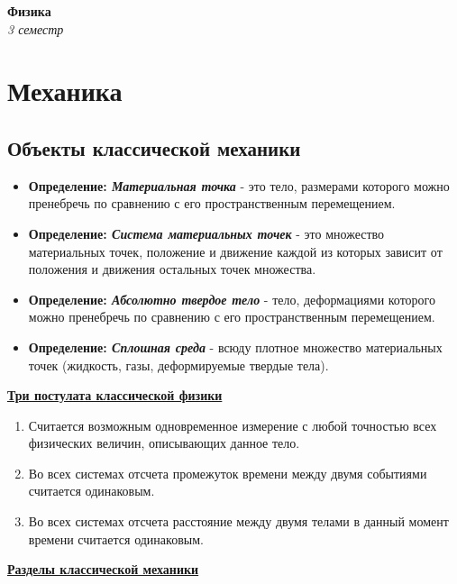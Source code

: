 \documentclass[12pt,a4paper]{report}
\begin{document}
\begin{titlepage}
    \centering
    \vspace*{1in}
    {\Huge \textbf{Физика}}\\[2cm]
    \textit{3 семестр}\\[0.5cm]
\end{titlepage}
\tableofcontents

\newpage
\chapter{Механика}
\section{Объекты классической механики}
\begin{itemize}
    \item \textbf{Определение: \textit{Материальная точка}} - это тело, размерами которого можно пренебречь по сравнению с его пространственным перемещением.
    \item \textbf{Определение: \textit{Система материальных точек}} - это множество материальных точек, положение и движение каждой из которых зависит от положения и движения остальных точек множества.
    \item \textbf{Определение: \textit{Абсолютно твердое тело}} - тело, деформациями которого можно пренебречь по сравнению с его пространственным перемещением.
    \item \textbf{Определение: \textit{Сплошная среда}} - всюду плотное множество материальных точек (жидкость, газы, деформируемые твердые тела).
\end{itemize}

\vspace{5px}

\underline{\textbf{Три постулата классической физики}}
\begin{enumerate}
    \item Считается возможным одновременное измерение с любой точностью всех физических величин, описывающих данное тело.
    \item Во всех системах отсчета промежуток времени между двумя событиями считается одинаковым.
    \item Во всех системах отсчета расстояние между двумя телами в данный момент времени считается одинаковым.
\end{enumerate}

\underline{\textbf{Разделы классической механики}}
\end{document}
